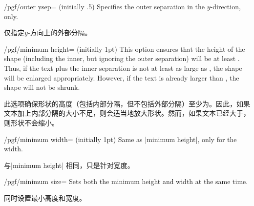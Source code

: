 \begin{key}{/pgf/outer ysep= (initially .5\string\pgflinewidth)}
    Specifies the outer separation in the $y$-direction, only.

    仅指定$y$-方向上的外部分隔。
\end{key}

\begin{key}{/pgf/minimum height= (initially 1pt)}
    This option ensures that the height of the shape (including the inner, but
    ignoring the outer separation) will be at least . Thus, if
    the text plus the inner separation is not at least as large as
    , the shape will be enlarged appropriately. However, if the
    text is already larger than , the shape will not be shrunk.
    
    
    此选项确保形状的高度（包括内部分隔，但不包括外部分隔）至少为。因此，如果文本加上内部分隔的大小不足，则会适当地放大形状。然而，如果文本已经大于，则形状不会缩小。
\begin{codeexample}[]
\end{codeexample}
\end{key}

\begin{key}{/pgf/minimum width= (initially 1pt)}
    Same as |minimum height|, only for the width.
    
    与|minimum height| 相同，只是针对宽度。
\begin{codeexample}[]
\end{codeexample}
\end{key}

\begin{key}{/pgf/minimum size=}
    Sets both the minimum height and width at the same time.
    
    同时设置最小高度和宽度。
\begin{codeexample}[]
\end{codeexample}
\end{key}

